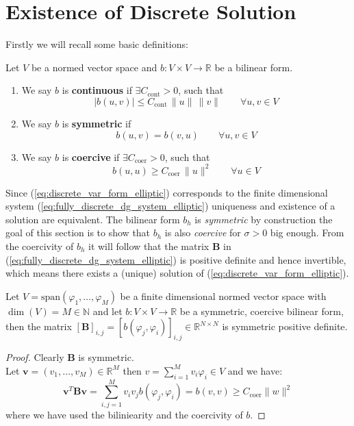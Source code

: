 \section{Existence of Discrete Solution}
\label{sec:existence_uniqueness_elliptic_discrete_problem}
Firstly we will recall some basic definitions:
\begin{definition} Let $V$ be a normed vector space and $b:V\times V \to \mathbb{R}$
	be a bilinear form.
	\begin{enumerate}[label=\textnormal{(\roman*)}]
		\item We say $b$ is \textbf{continuous} if $\exists C_{\text{cont}}>0$, such that
		      \[
			      |b(u,v)|\leq C_{\text{cont}}\, \|u\|\, \|v\| \qquad \forall u,v \in V
		      \]
		\item We say $b$ is \textbf{symmetric} if
		      \[
			      b(u,v) = b(v,u) \qquad \forall u,v \in V
		      \]
		\item We say $b$ is \textbf{coercive} if $\exists C_{\text{coer}}>0$, such that
		      \[
			      b(u,u)\geq C_{\text{coer}}\, \|u\|^2 \qquad \forall u \in V
		      \]
	\end{enumerate}
\end{definition}


Since (\ref{eq:discrete_var_form_elliptic}) corresponds to the finite dimensional
system (\ref{eq:fully_discrete_dg_system_elliptic}) uniqueness and existence of a solution
are equivalent.
The bilinear form $b_h$ is \textit{symmetric} by construction
the goal of this section is to show that $b_h$ is also \textit{coercive} for $\sigma > 0$ big enough.
From the coercivity of $b_h$ it will follow that the matrix $\textbf{B}$ in (\ref{eq:fully_discrete_dg_system_elliptic})
is positive definite and hence invertible, which means there exists a (unique) solution
of (\ref{eq:discrete_var_form_elliptic}).
\begin{lemma}
	Let $V = \text{span}(\varphi_1,\ldots,\varphi_M)$ be a finite dimensional
	normed vector space with $\dim(V) = M\in \mathbb{N}$ and let
	$b:V \times V \to \mathbb{R}$ be a symmetric, coercive bilinear form,
	then the matrix ${[\textbf{B}]}_{i,j} = {[b(\varphi_j, \varphi_i)]}_{i,j}\in \mathbb{R}^{N\times N}$
	is symmetric positive definite.
\end{lemma}
\begin{proof}
	Clearly $\textbf{B}$ is symmetric. \\
	Let $\textbf{v}=(v_1,\ldots,v_M)\in \mathbb{R}^M$ then $v = \sum_{i=1}^{M}
		v_i \varphi_i\in V$ and we have:
	\[
		\textbf{v}^{T}\textbf{B}\textbf{v} = \sum_{i,j=1}^{M}v_i v_j b(\varphi_j,\varphi_i) = b(v,v) \geq
		C_{\text{coer}} \|w\|^2
	\]
	where we have used the biliniearity and the coercivity of $b$.
\end{proof}

